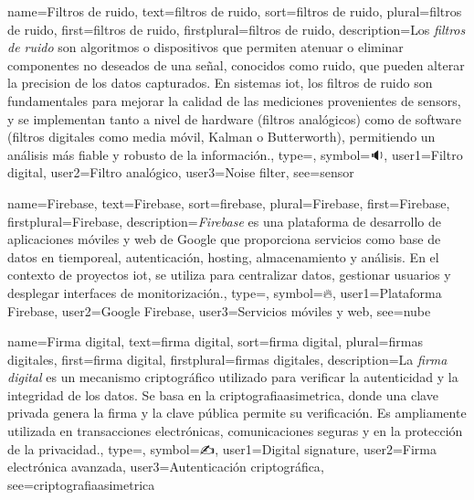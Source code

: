 	{
		name={Filtros de ruido},
		text={filtros de ruido},
		sort={filtros de ruido},
		plural={filtros de ruido},
		first={filtros de ruido},
		firstplural={filtros de ruido},
		description={Los \emph{filtros de ruido} son algoritmos o dispositivos que permiten atenuar o eliminar componentes no deseados de una se{\~n}al, conocidos como ruido, que pueden alterar la \gls{precision} de los \glspl{dato} capturados. En sistemas \gls{iot}, los filtros de ruido son fundamentales para mejorar la calidad de las mediciones provenientes de \glspl{sensor}, y se implementan tanto a nivel de \gls{hardware} (filtros anal{\'o}gicos) como de software (filtros digitales como media m{\'o}vil, Kalman o Butterworth), permitiendo un an{\'a}lisis m{\'a}s fiable y robusto de la informaci{\'o}n.},
		type=\glsdefaulttype,
		symbol={🔉},
		user1={Filtro digital},
		user2={Filtro anal{\'o}gico},
		user3={Noise filter},
		see={sensor}
	}
	
	{
		name={Firebase},
		text={Firebase},
		sort={firebase},
		plural={Firebase},
		first={Firebase},
		firstplural={Firebase},
		description={\emph{Firebase} es una plataforma de desarrollo de aplicaciones m{\'o}viles y web de Google que proporciona servicios como base de datos en \gls{tiemporeal}, autenticaci{\'o}n, hosting, almacenamiento y an{\'a}lisis. En el contexto de proyectos \gls{iot}, se utiliza para centralizar \glspl{dato}, gestionar usuarios y desplegar interfaces de monitorizaci{\'o}n.},
		type=\glsdefaulttype,
		symbol={🔥},
		user1={Plataforma Firebase},
		user2={Google Firebase},
		user3={Servicios m{\'o}viles y web},
		see={nube}
	}
	
	
	
	{
		name={Firma digital},
		text={firma digital},
		sort={firma digital},
		plural={firmas digitales},
		first={firma digital},
		firstplural={firmas digitales},
		description={La \emph{firma digital} es un mecanismo criptogr{\'a}fico utilizado para verificar la autenticidad y la \gls{integridad} de los \glspl{dato}. Se basa en la \gls{criptografiaasimetrica}, donde una clave privada genera la firma y la clave p{\'u}blica permite su verificaci{\'o}n. Es ampliamente utilizada en transacciones electr{\'o}nicas, comunicaciones seguras y en la protecci{\'o}n de la \gls{privacidad}.},
		type=\glsdefaulttype,
		symbol={✍️},
		user1={Digital signature},
		user2={Firma electr{\'o}nica avanzada},
		user3={Autenticaci{\'o}n criptogr{\'a}fica},
		see={criptografiaasimetrica}
	}
	
